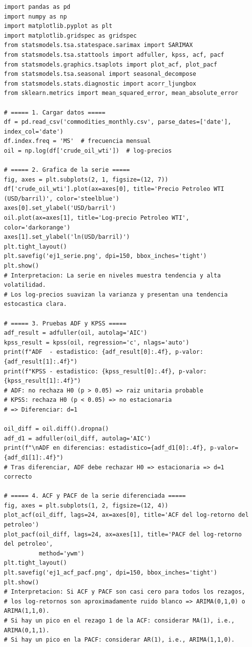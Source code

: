 \documentclass[12pt,a4paper]{article}
\theoremstyle{definition}
\begin{document}
\begin{lstlisting}[style=python, caption={Ejemplo 1: ARIMA para log-precios del petróleo WTI}]
import pandas as pd
import numpy as np
import matplotlib.pyplot as plt
import matplotlib.gridspec as gridspec
from statsmodels.tsa.statespace.sarimax import SARIMAX
from statsmodels.tsa.stattools import adfuller, kpss, acf, pacf
from statsmodels.graphics.tsaplots import plot_acf, plot_pacf
from statsmodels.tsa.seasonal import seasonal_decompose
from statsmodels.stats.diagnostic import acorr_ljungbox
from sklearn.metrics import mean_squared_error, mean_absolute_error

# ===== 1. Cargar datos =====
df = pd.read_csv('commodities_monthly.csv', parse_dates=['date'], index_col='date')
df.index.freq = 'MS'  # frecuencia mensual
oil = np.log(df['crude_oil_wti'])  # log-precios

# ===== 2. Grafica de la serie =====
fig, axes = plt.subplots(2, 1, figsize=(12, 7))
df['crude_oil_wti'].plot(ax=axes[0], title='Precio Petroleo WTI (USD/barril)', color='steelblue')
axes[0].set_ylabel('USD/barril')
oil.plot(ax=axes[1], title='Log-precio Petroleo WTI', color='darkorange')
axes[1].set_ylabel('ln(USD/barril)')
plt.tight_layout()
plt.savefig('ej1_serie.png', dpi=150, bbox_inches='tight')
plt.show()
# Interpretacion: La serie en niveles muestra tendencia y alta volatilidad.
# Los log-precios suavizan la varianza y presentan una tendencia estocastica clara.

# ===== 3. Pruebas ADF y KPSS =====
adf_result = adfuller(oil, autolag='AIC')
kpss_result = kpss(oil, regression='c', nlags='auto')
print(f"ADF  - estadistico: {adf_result[0]:.4f}, p-valor: {adf_result[1]:.4f}")
print(f"KPSS - estadistico: {kpss_result[0]:.4f}, p-valor: {kpss_result[1]:.4f}")
# ADF: no rechaza H0 (p > 0.05) => raiz unitaria probable
# KPSS: rechaza H0 (p < 0.05) => no estacionaria
# => Diferenciar: d=1

oil_diff = oil.diff().dropna()
adf_d1 = adfuller(oil_diff, autolag='AIC')
print(f"\nADF en diferencias: estadistico={adf_d1[0]:.4f}, p-valor={adf_d1[1]:.4f}")
# Tras diferenciar, ADF debe rechazar H0 => estacionaria => d=1 correcto

# ===== 4. ACF y PACF de la serie diferenciada =====
fig, axes = plt.subplots(1, 2, figsize=(12, 4))
plot_acf(oil_diff, lags=24, ax=axes[0], title='ACF del log-retorno del petroleo')
plot_pacf(oil_diff, lags=24, ax=axes[1], title='PACF del log-retorno del petroleo',
          method='ywm')
plt.tight_layout()
plt.savefig('ej1_acf_pacf.png', dpi=150, bbox_inches='tight')
plt.show()
# Interpretacion: Si ACF y PACF son casi cero para todos los rezagos,
# los log-retornos son aproximadamente ruido blanco => ARIMA(0,1,0) o ARIMA(1,1,0).
# Si hay un pico en el rezago 1 de la ACF: considerar MA(1), i.e., ARIMA(0,1,1).
# Si hay un pico en la PACF: considerar AR(1), i.e., ARIMA(1,1,0).


\end{lstlisting}
\end{document}
